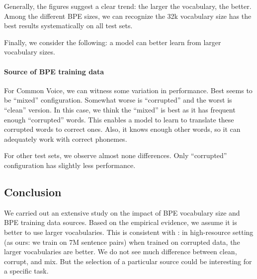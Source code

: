 Generally, the figures suggest a clear trend: the larger the vocabulary, the better. Among the different BPE sizes, we can recognize the 32k vocabulary size has the best results systematically on all test sets.

Finally, we consider the following: a model can better learn from larger vocabulary sizes. 

\paragraph{Source of BPE training data}
For Common Voice, we can witness some variation in performance. Best seems to be ``mixed'' configuration. Somewhat worse is ``corrupted'' and the worst is ``clean'' version. In this case, we think the ``mixed'' is best as it has frequent enough ``corrupted'' words. This enables a model to learn to translate these corrupted words to correct ones. Also, it knows enough other words, so it can adequately work with correct phonemes.

For other test sets, we observe almost none differences. Only ``corrupted'' configuration has slightly less performance. 


\subsection{Conclusion}
\label{easr:tok_conclusion}
We carried out an extensive study on the impact of BPE vocabulary size and BPE training data sources. Based on the empirical evidence, we assume it is better to use larger vocabularies. This is consistent with : in high-resource setting (as ours: we train on 7M sentence pairs) when trained on corrupted data, the larger vocabularies are better. We do not see much difference between clean, corrupt, and mix. But the selection of a particular source could be interesting for a specific task.


